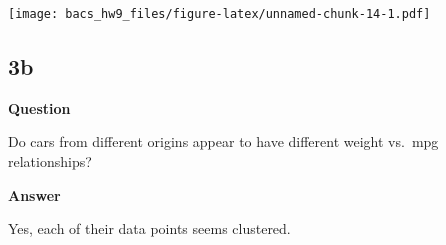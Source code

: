 \documentclass[
]{article}
\begin{document}
\texttt{[image: bacs\_hw9\_files/figure-latex/unnamed-chunk-14-1.pdf]}

\hypertarget{b-2}{%
\subsection{3b}\label{b-2}}

\textbf{Question}

Do cars from different origins appear to have different weight vs.~mpg
relationships?

\textbf{Answer}

Yes, each of their data points seems clustered.
\end{document}
